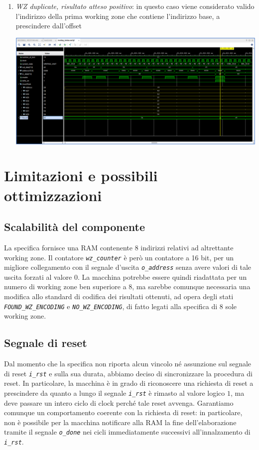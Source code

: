 \documentclass[12pt,a4paper,titlepage]{article}
\begin{document}
\begin{enumerate}
	\item \textit{WZ duplicate, risultato atteso positivo}: in questo caso viene considerato valido l'indirizzo della prima working zone che contiene l'indirizzo base, a prescindere dall'offset
	
		\begin{center}
			\includegraphics[scale=0.4]{test13.png}
		\end{center}
		\vspace{0.5cm}
	
	\end{enumerate}
		
	\section{Limitazioni e possibili ottimizzazioni}
		\subsection{Scalabilità del componente}
			La specifica fornisce una RAM contenente 8 indirizzi relativi ad altrettante working zone. Il contatore \textit{\texttt{wz\_counter}} è però un contatore a 16 bit, per un migliore collegamento con il segnale d'uscita \textit{\texttt{o\_address}} senza avere valori di tale uscita forzati al valore $0$. La macchina potrebbe essere quindi riadattata per un numero di working zone ben superiore a 8, ma sarebbe comunque necessaria una modifica allo standard di codifica dei risultati ottenuti, ad opera degli stati \textit{\texttt{FOUND\_WZ\_ENCODING}} e \textit{\texttt{NO\_WZ\_ENCODING}}, di fatto legati alla specifica di 8 sole working zone.
		\subsection{Segnale di reset} \label{sec:reset}
			Dal momento che la specifica non riporta alcun vincolo né assunzione sul segnale di reset \textit{\texttt{i\_rst}} e sulla sua durata, abbiamo deciso di sincronizzare la procedura di reset. In particolare, la macchina è in grado di riconoscere una richiesta di reset a prescindere da quanto a lungo il segnale \textit{\texttt{i\_rst}} è rimasto al valore logico $1$, ma deve passare un intero ciclo di clock perché tale reset avvenga. Garantiamo comunque un comportamento coerente con la richiesta di reset: in particolare, non è possibile per la macchina notificare alla RAM la fine dell'elaborazione tramite il segnale \textit{\texttt{o\_done}} nei cicli immediatamente successivi all'innalzamento di \textit{\texttt{i\_rst}}.
\end{document}
